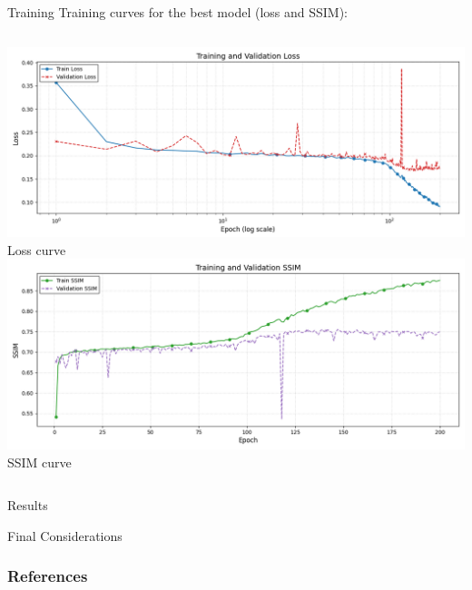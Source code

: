 \documentclass[8pt]{beamer}
\begin{document}
\begin{frame}{Training}
    Training curves for the best model (loss and SSIM):
    \vspace{2em}
    \begin{columns}
            \includegraphics[width=\linewidth]{images/loss_curve.png}
            \newline
            \centering \small Loss curve 
            \includegraphics[width=\linewidth]{images/ssim_curve.png}
            \newline
            \centering \small SSIM curve
    \end{columns}
\end{frame}

\begin{frame}{Results}
\end{frame}

\begin{frame}{Final Considerations}
\end{frame}

\begin{frame}
    \frametitle{References}
    \printbibliography
\end{frame}
\end{document}
